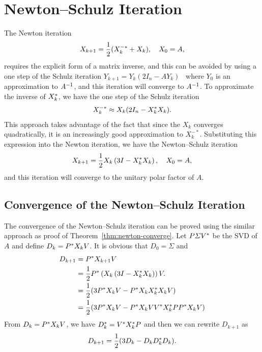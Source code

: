 \documentclass[12pt]{article}
\begin{document}
\section{Newton--Schulz Iteration}

The Newton iteration 
\begin{equation}
    \notag
    X_{k+1} = \frac 12(X_k^{-*} + X_k),\quad X_0 = A,
\end{equation}
requires the explicit form of a matrix inverse, and this can be avoided by using a one step of the Schulz iteration $Y_{k+1} = Y_k(2I_n - AY_k)$~ where $Y_0$ is an approximation to $A^{-1}$, and this iteration will converge to $A^{-1}$. To approximate the inverse of $X_k^*$, we have the one step of the Schulz iteration 
\begin{equation}
    \notag 
    X_k^{-*} \approx X_k(2I_n - X_k^* X_k).
\end{equation}
This approach takes advantage of the fact that since the $X_k$ converges quadratically, it is an increasingly good approximation to $X_k^{-*}$.
Substituting this expression into the Newton iteration, we have the Newton--Schulz iteration~ 
\begin{equation}
    \label{eq:ns-iteration}
    X_{k+1} = \frac 12 X_k\left(3I - X_k^* X_k\right), \quad X_0 = A,
\end{equation}
and this iteration will converge to the unitary polar factor of $A$.

\subsection{Convergence of the Newton--Schulz Iteration}
The convergence of the Newton--Schulz iteration can be proved 
using the similar approach as proof of Theorem~\ref{thm:newton-converge}. Let $P\varSigma V^*$ be the SVD of $A$ and define $D_k = P^* X_k V$. It is obvious that $D_0 = \Sigma$ and 
\begin{equation}
    \notag 
    \begin{aligned}
        D_{k+1} &= P^* X_{k+1} V\\
        & = \frac{1}{2}P^* \left(X_k\left(3I - X_k^* X_k\right)\right)V.\\
        & = \frac{1}{2} (3P^* X_k V - P^* X_kX_k^* X_k V)\\
        & = \frac{1}{2} (3P^* X_k V - P^* X_k V V^* X_k^* P P^* X_k V)
    \end{aligned}
\end{equation}
From $D_k = P^* X_k V$, we have $D_k^* = V^* X_k^* P$ and then we can rewrite $D_{k+1}$ as
\begin{equation}
    \label{eq:ns-iter1}
    D_{k+1} = \frac{1}{2}(3D_k-D_kD_k^* D_k).
\end{equation}
\end{document}

